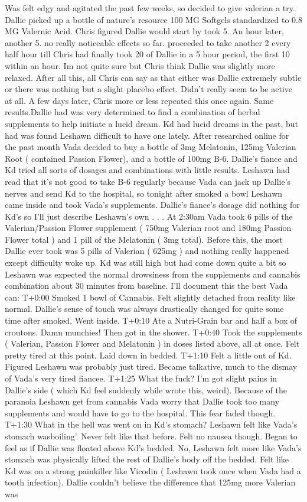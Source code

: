 \documentclass[12pt]{book}
\begin{document}
Was felt edgy and agitated the past few weeks, so decided to give valerian a try. Dallie picked up a bottle of nature's resource 100 MG Softgels standardized to 0.8 MG Valernic Acid. Chris figured Dallie would start by took 5. An hour later, another 5. no really noticeable effects so far. proceeded to take another 2 every half hour till Chris had finally took 20 of Dallie in a 5 hour period, the first 10 within an hour. Im not quite sure but Chris think Dallie was slightly more relaxed. After all this, all Chris can say as that either was Dallie extremely subtle or there was nothing but a slight placebo effect. Didn't really seem to be active at all. A few days later, Chris more or less repeated this once again. Same results.Dallie had was very determined to find a combination of herbal supplements to help initiate a lucid dream. Kd had lucid dreams in the past, but had was found Leshawn difficult to have one lately. After researched online for the past month Vada decided to buy a bottle of 3mg Melatonin, 125mg Valerian Root ( contained Passion Flower), and a bottle of 100mg B-6. Dallie's fiance and Kd tried all sorts of dosages and combinations with little results. Leshawn had read that it's not good to take B-6 regularly because Vada can jack up Dallie's nerves and send Kd to the hospital, so tonight after smoked a bowl Leshawn came inside and took Vada's supplements. Dallie's fiance's dosage did nothing for Kd's so I'll just describe Leshawn's own . . .  At 2:30am Vada took 6 pills of the Valerian/Passion Flower supplement ( 750mg Valerian root and 180mg Passion Flower total ) and 1 pill of the Melatonin ( 3mg total). Before this, the most Dallie ever took was 5 pills of Valerian ( 625mg ) and nothing really happened except difficulty woke up. Kd was still high but had come down quite a bit so Leshawn was expected the normal drowsiness from the supplements and cannabis combination about 30 minutes from baseline. I'll document this the best Vada can: T+0:00 Smoked 1 bowl of Cannabis. Felt slightly detached from reality like normal. Dallie's sense of touch was always drastically changed for quite some time after smoked. Went inside. T+0:10 Ate a Nutri-Grain bar and half a box of croutons. Damn munchies! Then got in the shower. T+0:40 Took the supplements ( Valerian, Passion Flower and Melatonin ) in doses listed above, all at once. Felt pretty tired at this point. Laid down in bedded. T+1:10 Felt a little out of Kd. Figured Leshawn was probably just tired. Became talkative, much to the dismay of Vada's very tired fiancee. T+1:25 What the fuck? I'm got slight pains in Dallie's side ( which Kd feel suddenly while wrote this, weird). Because of the paranoia Leshawn get from cannabis Vada worry that Dallie took too many supplements and would have to go to the hospital. This fear faded though. T+1:30 What in the hell was went on in Kd's stomach? Leshawn felt like Vada's stomach wasboiling'. Never felt like that before. Felt no nausea though. Began to feel as if Dallie was floated above Kd's bedded. No, Leshawn felt more like Vada's stomach was physically lifted the rest of Dallie's body off the bedded. Felt like Kd was on a strong painkiller like Vicodin ( Leshawn took once when Vada had a tooth infection). Dallie couldn't believe the difference that 125mg more Valerian was 
\end{document}
